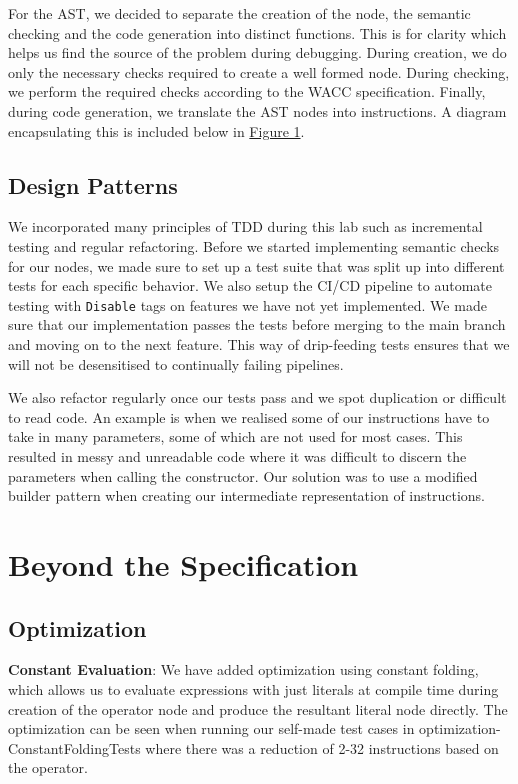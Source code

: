 \documentclass[11pt,a4paper]{article}
\newcommand{\cmd}[1]{\texttt{#1}}
\begin{document}
For the AST, we decided to separate the creation of the node, the semantic checking and the code generation into distinct functions. This is for clarity which helps us find the source of the problem during debugging. During creation, we do only the necessary checks required to create a well formed node. During checking, we perform the required checks according to the WACC specification. Finally, during code generation, we translate the AST nodes into instructions. A diagram encapsulating this is included below in \hyperref[sec:figure1]{Figure 1}.

\subsection{Design Patterns}
We incorporated many principles of TDD during this lab such as incremental testing and regular refactoring. Before we started implementing semantic checks for our nodes, we made sure to set up a test suite that was split up into different tests for each specific behavior. We also setup the CI/CD pipeline to automate testing with \cmd{Disable} tags on features we have not yet implemented. We made sure that our implementation passes the tests before merging to the main branch and moving on to the next feature. This way of drip-feeding tests ensures that we will not be desensitised to continually failing pipelines.

We also refactor regularly once our tests pass and we spot duplication or difficult to read code. An example is when we realised some of our instructions have to take in many parameters, some of which are not used for most cases. This resulted in messy and unreadable code where it was difficult to discern the parameters when calling the constructor. Our solution was to use a modified builder pattern when creating our intermediate representation of instructions.

\section{Beyond the Specification}

\subsection{Optimization}
\textbf{Constant Evaluation}: We have added optimization using constant folding, which allows us to evaluate expressions with just literals at compile time during creation of the operator node and produce the resultant literal node directly. The optimization can be seen when running our self-made test cases in optimization- ConstantFoldingTests where there was a reduction of 2-32 instructions based on the operator. 
\newline
\end{document}
